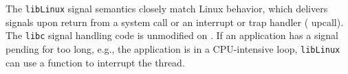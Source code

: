 
The \graphene{} {\tt libLinux} signal semantics closely match Linux behavior, which
delivers signals upon return from a system call or an interrupt or trap handler (\pal{} upcall).
The {\tt libc} signal handling code is unmodified on \graphene{}.
If an application has a signal pending for too long,
e.g., the application is in a CPU-intensive loop, {\tt libLinux} can use a \pal{} function to interrupt 
the thread. 

